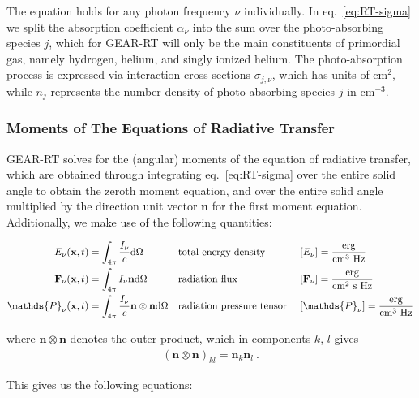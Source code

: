 The equation holds for any photon frequency $\nu$ individually. In eq.~\ref{eq:RT-sigma} we split
the absorption coefficient $\alpha_\nu$ into the sum over the photo-absorbing species $j$, which
for GEAR-RT will only be the main constituents of primordial gas, namely hydrogen, helium,
and singly ionized helium. The photo-absorption process is expressed via interaction cross sections
$\sigma_{j,\nu}$, which has units of cm$^2$, while $n_j$ represents the number density of
photo-absorbing species $j$ in cm$^{-3}$.



\subsubsection{Moments of The Equations of Radiative Transfer}


GEAR-RT solves for the (angular) moments of the equation of radiative transfer, which are obtained
through integrating eq.~\ref{eq:RT-sigma} over the entire solid angle to obtain the zeroth moment
equation, and over the entire solid angle multiplied by the direction unit vector $\mathbf{n}$ for
the first moment equation.
Additionally, we make use of the following quantities:

\begin{align*}
	E_\nu (\x, t) &= \int_{4 \pi} \frac{I_\nu}{c} \de \Omega
			&& \text{total energy density }
			&& [E_\nu] = \frac{\text{erg}}{\text{cm}^3 \text{ Hz}}\\
	\Fbf_\nu(\x, t) &= \int_{4 \pi}  I_\nu \mathbf{n} \de \Omega
			&& \text{radiation flux }
			&& [\Fbf_\nu] = \frac{\text{erg}}{\text{cm}^2 \text{ s Hz}}\\
	\mathds{P}_\nu (\x, t) &= \int_{4 \pi} \frac{I_\nu}{c} \mathbf{n} \otimes \mathbf{n} \de \Omega
			&& \text{radiation pressure tensor }
			&& [\mathds{P}_\nu ] = \frac{\text{erg}}{\text{cm}^3 \text{ Hz}}
\end{align*}

where $\mathbf{n} \otimes \mathbf{n}$ denotes the outer product, which in components $k$, $l$ gives
%
\begin{align*}
 (\mathbf{n} \otimes \mathbf{n})_{kl} = \mathbf{n}_k \mathbf{n}_l \ .
\end{align*}



This gives us the following equations:


